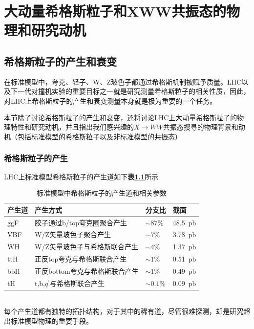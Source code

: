 \chapter{大动量希格斯粒子和XWW共振态的物理和研究动机}
\label{chap2}
\fontsize{12bp}{14.4pt}

\section{希格斯粒子的产生和衰变}
在标准模型中，夸克、轻子、W、Z玻色子都通过希格斯机制被赋予质量。LHC以及下一代对撞机实验的重要目标之一就是研究测量希格斯粒子的相关性质，因此，对LHC上希格斯粒子的产生和衰变测量本身就是极为重要的一个任务。

本节除了讨论希格斯粒子的产生和衰变，还将讨论LHC上大动量希格斯粒子的物理特性和研究动机，并且指出我们感兴趣的$X\to WW$共振态搜寻的物理背景和动机（包括标准模型的希格斯粒子以及非标准模型的共振态）
\subsection{希格斯粒子的产生}
LHC上标准模型希格斯粒子的产生道如下\textbf{表\ref{table:2.1}}所示
\begin{table}[htbp]
    \caption{标准模型中希格斯粒子的产生道和相关参数\cite{Higgs_cross_sections}}\label{table:2.1}
    \centering
    \begin{tabular}{>{\centering\arraybackslash}p{2cm}%
    >{\centering\arraybackslash}p{7cm}%
    >{\centering\arraybackslash}p{2cm}%
    >{\centering\arraybackslash}p{2cm}}
    \toprule\toprule
    \textbf{产生道} & \textbf{产生方式} & \textbf{分支比} & \textbf{截面}\\
    \midrule
    ggF & 胶子通过b/top夸克圈聚合产生 & $\sim 87\%$ & \SI{48.5}{pb}\\
    VBF & W/Z矢量玻色子聚合产生 & $\sim7\%$ & \SI{3.78}{pb}\\
    WH & W/Z矢量玻色子与希格斯联合产生 & $\sim 4\%$ & \SI{1.37}{pb}\\
    ttH & 正反top夸克与希格斯联合产生 & $\sim1\%$ & \SI{0.51}{pb}\\
    bbH & 正反bottom夸克与希格斯联合产生 &  $\sim 1\%$ & \SI{0.49}{pb}\\
    tH & t,b,$q^\prime$与希格斯联合产生 & $\sim 0.1\%$ & \SI{0.09}{pb}\\
    \bottomrule\bottomrule
\end{tabular}
\end{table}\\
每个产生道都有独特的拓扑结构，对于其中的稀有道，尽管很难探测，却是研究超出标准模型物理的重要手段。

